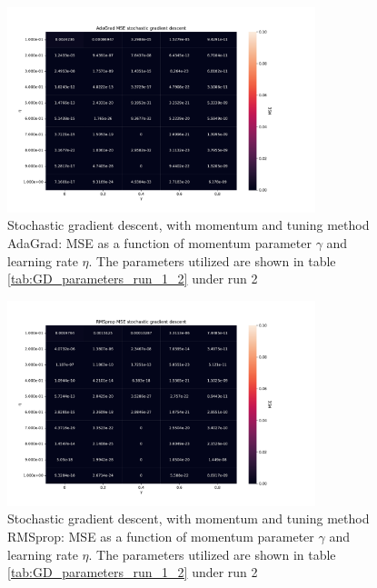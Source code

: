 \begin{figure}[H]
\centering
\includegraphics[width=0.8\textwidth]{Figures/PartA/AdaGrad_sgdm_MSE(eta,momentum)}
\caption{Stochastic gradient descent, with momentum and tuning method AdaGrad:
    MSE as a function of momentum parameter $\gamma$ and learning rate \(\eta \). The parameters utilized are shown in table \ref{tab:GD_parameters_run_1_2} under run 2	 }
\label{fig:AdaGrad_sgdm_MSE-eta-momentum-}
\end{figure}

\begin{figure}[H]
\centering
\includegraphics[width=0.8\textwidth]{Figures/PartA/RMSprop_sgdm_MSE(eta,momentum)}
\caption{Stochastic gradient descent, with momentum and tuning method
    RMSprop: MSE as a function of momentum parameter $\gamma$ and learning
    rate \(\eta \). The parameters utilized are shown in table \ref{tab:GD_parameters_run_1_2} under run 2	 }
\label{fig:RMSprop_sgdm_MSE-eta-momentum-}
\end{figure}

